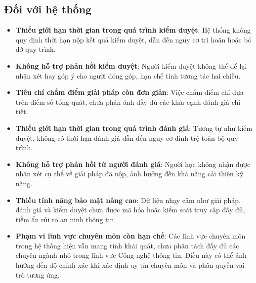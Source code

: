 \subsection{Đối với hệ thống}
\begin{itemize}
  \item \textbf{Thiếu giới hạn thời gian trong quá trình kiểm duyệt}: Hệ thống không quy định thời hạn nộp kết quả kiểm duyệt, dẫn đến nguy cơ trì hoãn hoặc bỏ dở quy trình.
  \item \textbf{Không hỗ trợ phản hồi kiểm duyệt}: Người kiểm duyệt không thể để lại nhận xét hay góp ý cho người đóng góp, hạn chế tính tương tác hai chiều.
  \item \textbf{Tiêu chí chấm điểm giải pháp còn đơn giản}: Việc chấm điểm chỉ dựa trên điểm số tổng quát, chưa phản ánh đầy đủ các khía cạnh đánh giá chi tiết.
  \item \textbf{Thiếu giới hạn thời gian trong quá trình đánh giá}: Tương tự như kiểm duyệt, không có thời hạn đánh giá dẫn đến nguy cơ đình trệ toàn bộ quy trình.
  \item \textbf{Không hỗ trợ phản hồi từ người đánh giá}: Người học không nhận được nhận xét cụ thể về giải pháp đã nộp, ảnh hưởng đến khả năng cải thiện kỹ năng.
  \item \textbf{Thiếu tính năng bảo mật nâng cao}: Dữ liệu nhạy cảm như giải pháp, đánh giá và kiểm duyệt chưa được mã hóa hoặc kiểm soát truy cập đầy đủ, tiềm ẩn rủi ro an ninh thông tin.
  \item \textbf{Phạm vi lĩnh vực chuyên môn còn hạn chế}: Các lĩnh vực chuyên môn trong hệ thống hiện vẫn mang tính khái quát, chưa phân tách đầy đủ các chuyên ngành nhỏ trong lĩnh vực Công nghệ thông tin.
        Điều này có thể ảnh hưởng đến độ chính xác khi xác định uy tín chuyên môn và phân quyền vai trò tương ứng.
\end{itemize}

